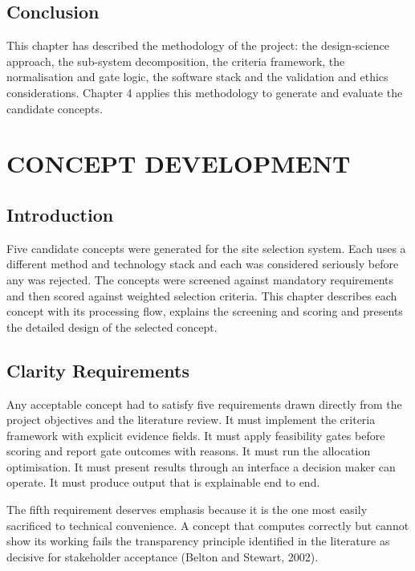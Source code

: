 \documentclass[12pt,a4paper]{report}
\begin{document}
\section{Conclusion}
This chapter has described the methodology of the project: the
design-science approach, the sub-system decomposition, the criteria
framework, the normalisation and gate logic, the software stack and
the validation and ethics considerations. Chapter 4 applies this
methodology to generate and evaluate the candidate concepts.

\chapter{CONCEPT DEVELOPMENT}

\section{Introduction}
Five candidate concepts were generated for the site selection system.
Each uses a different method and technology stack and each was
considered seriously before any was rejected. The concepts were
screened against mandatory requirements and then scored against
weighted selection criteria. This chapter describes each concept with
its processing flow, explains the screening and scoring and presents
the detailed design of the selected concept.

\section{Clarity Requirements}
Any acceptable concept had to satisfy five requirements drawn directly
from the project objectives and the literature review. It must
implement the criteria framework with explicit evidence fields. It
must apply feasibility gates before scoring and report gate outcomes
with reasons. It must run the allocation optimisation. It must present
results through an interface a decision maker can operate. It must
produce output that is explainable end to end.

The fifth requirement deserves emphasis because it is the one most
easily sacrificed to technical convenience. A concept that computes
correctly but cannot show its working fails the transparency principle
identified in the literature as decisive for stakeholder acceptance
(Belton and Stewart, 2002).
\end{document}
